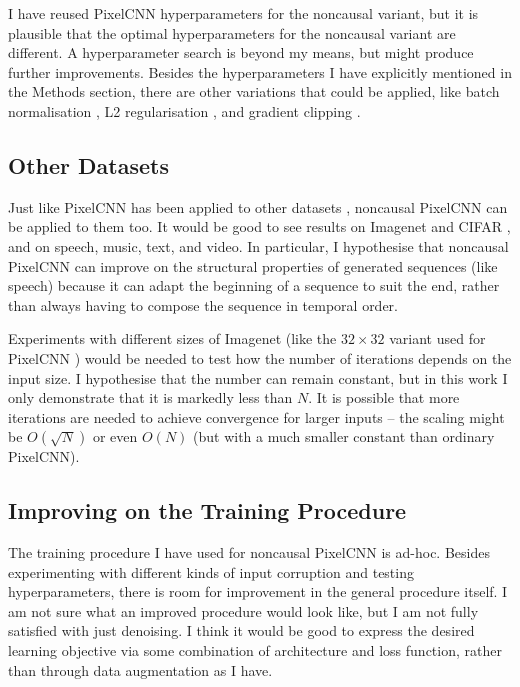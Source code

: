 \documentclass[10pt,a4paper]{article}
\begin{document}
I have reused PixelCNN hyperparameters for the noncausal variant, but it is plausible that the optimal hyperparameters for the noncausal variant are different. A hyperparameter search is beyond my means, but might produce further improvements. Besides the hyperparameters I have explicitly mentioned in the Methods section, there are other variations that could be applied, like batch normalisation \cite{batchnormalisation}, L2 regularisation \cite{??}, and gradient clipping \cite{??}.

\subsection{Other Datasets}

Just like PixelCNN has been applied to other datasets \cite{??,??,??}, noncausal PixelCNN can be applied to them too. It would be good to see results on Imagenet \cite{??} and CIFAR \cite{??}, and on speech, music, text, and video. In particular, I hypothesise that noncausal PixelCNN can improve on the structural properties of generated sequences (like speech) because it can adapt the beginning of a sequence to suit the end, rather than always having to compose the sequence in temporal order.

Experiments with different sizes of Imagenet (like the $32\times 32$ variant used for PixelCNN \cite{??}) would be needed to test how the number of iterations depends on the input size. I hypothesise that the number can remain constant, but in this work I only demonstrate that it is markedly less than $N$. It is possible that more iterations are needed to achieve convergence for larger inputs -- the scaling might be $O(\sqrt{N})$ or even $O(N)$ (but with a much smaller constant than ordinary PixelCNN).

\subsection{Improving on the Training Procedure}

The training procedure I have used for noncausal PixelCNN is ad-hoc. Besides experimenting with different kinds of input corruption and testing hyperparameters, there is room for improvement in the general procedure itself. I am not sure what an improved procedure would look like, but I am not fully satisfied with just denoising. I think it would be good to express the desired learning objective via some combination of architecture and loss function, rather than through data augmentation as I have.
\end{document}
